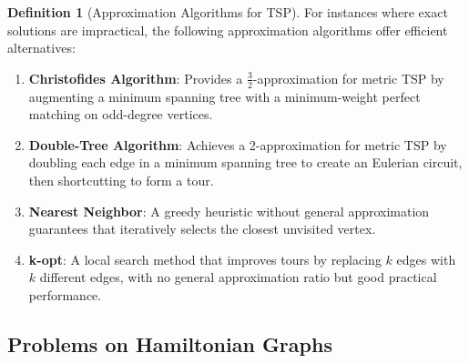 \documentclass{article}
\theoremstyle{definition}
\newtheorem{definition}{Definition}
\begin{document}
\begin{definition}[Approximation Algorithms for TSP]
For instances where exact solutions are impractical, the following approximation algorithms offer efficient alternatives:

\begin{enumerate}
    \item \textbf{Christofides Algorithm}: Provides a $\frac{3}{2}$-approximation for metric TSP by augmenting a minimum spanning tree with a minimum-weight perfect matching on odd-degree vertices.
    
    \item \textbf{Double-Tree Algorithm}: Achieves a 2-approximation for metric TSP by doubling each edge in a minimum spanning tree to create an Eulerian circuit, then shortcutting to form a tour.
    
    \item \textbf{Nearest Neighbor}: A greedy heuristic without general approximation guarantees that iteratively selects the closest unvisited vertex.
    
    \item \textbf{k-opt}: A local search method that improves tours by replacing $k$ edges with $k$ different edges, with no general approximation ratio but good practical performance.
\end{enumerate}
\end{definition}

\subsection{Problems on Hamiltonian Graphs}
\end{document}
